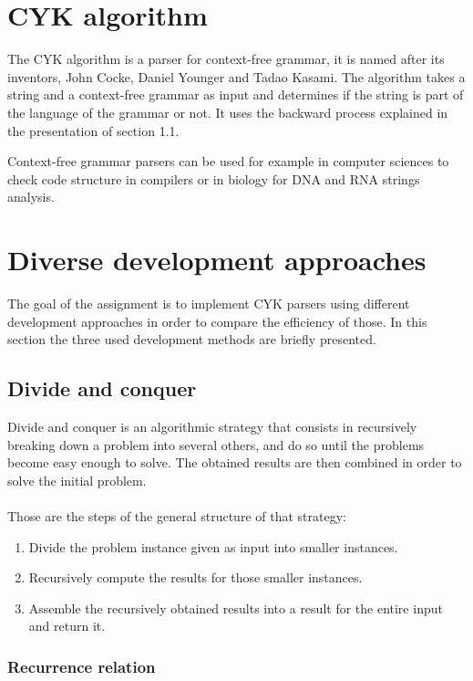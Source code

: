 \section{CYK algorithm}

The CYK algorithm is a parser for context-free grammar, it is named after its inventors, John Cocke, Daniel Younger and Tadao Kasami.
The algorithm takes a string and a context-free grammar as input and determines if the string is part of the language of the grammar or not.
It uses the backward process explained in the presentation of section 1.1.

Context-free grammar parsers can be used for example in computer sciences to check code structure in compilers or in biology for DNA and RNA strings analysis.

\section{Diverse development approaches}

The goal of the assignment is to implement CYK parsers using different development approaches in order to compare the efficiency of those.
In this section the three used development methods are briefly presented.

\subsection{Divide and conquer}

Divide and conquer is an algorithmic strategy that consists in recursively breaking down a problem into several others, and do so until the problems become easy enough to solve. 
The obtained results are then combined in order to solve the initial problem.
\\
\\
Those are the steps of the general structure of that strategy:

\begin{enumerate}
    \item Divide the problem instance given as input into smaller instances.
    \item Recursively compute the results for those smaller instances.
    \item Assemble the recursively obtained results into a result for the entire input and return it.
\end{enumerate}

\subsubsection{Recurrence relation}


